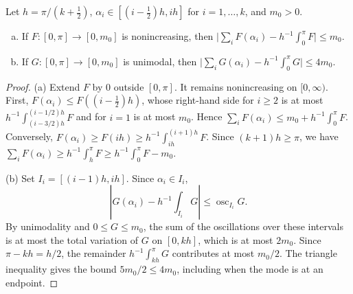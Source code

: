 \begin{lema}\label{lem:torres-riemann}
Let $h=\pi/(k+\frac12)$, $\alpha_i\in[(i-\frac12)h,ih]$ for $i=1,\dots,k$, and $m_0>0$.
\begin{enumerate}[(a)]
\item If $F:[0,\pi]\to[0,m_0]$ is nonincreasing, then
 $\bigl|\sum_iF(\alpha_i)-h^{-1}\int_0^\pi F\bigr|\le m_0$.
\item If $G:[0,\pi]\to[0,m_0]$ is unimodal, then
 $\bigl|\sum_iG(\alpha_i)-h^{-1}\int_0^\pi G\bigr|\le4m_0$.
\end{enumerate}
\end{lema}
\begin{proof}
(a) Extend $F$ by $0$ outside $[0,\pi]$. It remains nonincreasing on $[0,\infty)$. First,
$F(\alpha_i)\le F((i-\frac12)h)$, whose right-hand side for $i\ge2$ is at most
$h^{-1}\int_{(i-3/2)h}^{(i-1/2)h}F$ and for
$i=1$ is at most $m_0$. Hence $\sum_iF(\alpha_i)\le m_0+h^{-1}\int_0^\pi F$. Conversely,
$F(\alpha_i)\ge F(ih)\ge h^{-1}\int_{ih}^{(i+1)h}F$. Since $(k+1)h\ge\pi$, we have
$\sum_iF(\alpha_i)\ge h^{-1}\int_h^\pi F\ge h^{-1}\int_0^\pi F-m_0$.

(b) Set $I_i=[(i-1)h,ih]$. Since $\alpha_i\in I_i$,
\[
 \left|G(\alpha_i)-h^{-1}\int_{I_i}G\right|
 \le\operatorname{osc}_{I_i}G .
\]
By unimodality and $0\le G\le m_0$, the sum of the oscillations over these intervals
is at most the total variation of $G$ on $[0,kh]$, which is at most $2m_0$.
Since $\pi-kh=h/2$, the remainder $h^{-1}\int_{kh}^{\pi}G$ contributes at most $m_0/2$.
The triangle inequality gives the bound $5m_0/2\le4m_0$, including when the mode is at an endpoint.
\end{proof}
